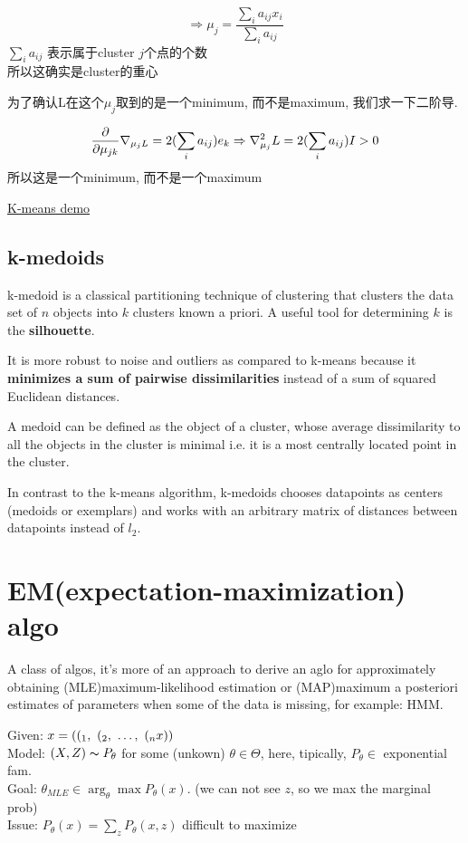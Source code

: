 \documentclass{article}
\begin{document}
$$
\Rightarrow
\mu_j = \dfrac{\sum_i a_{ij}x_i}{\sum_i a_{ij}}
$$
$\sum_i a_{ij}$  表示属于cluster $j$个点的个数\\
所以这确实是cluster的重心

为了确认L在这个$\mu_j$取到的是一个minimum, 而不是maximum, 我们求一下二阶导.

$$
\frac{\partial }{\partial \mu_{jk}} \nabla _{\mu_{j} L}
= 2(\sum_i a_{ij}) e_k
\Rightarrow
\nabla ^2_{\mu_j} L = 2(\sum_i a_{ij})I > 0
$$
所以这是一个minimum, 而不是一个maximum

\href{https://www.youtube.com/watch?v=zHbxbb2ye3E}{K-means demo}

\subsection{k-medoids}
k-medoid is a classical partitioning technique of clustering that clusters the data set of $n$ objects into $k$ clusters known a priori. 
A useful tool for determining $k$ is the \textbf{silhouette}.

It is more robust to noise and outliers as compared to k-means because it \textbf{minimizes a sum of pairwise dissimilarities} 
instead of a sum of squared Euclidean distances.

A medoid can be defined as the object of a cluster, whose average dissimilarity to all the objects in the cluster is minimal i.e. 
it is a most centrally located point in the cluster.

In contrast to the k-means algorithm, k-medoids chooses datapoints as centers (medoids or exemplars) and 
works with an arbitrary matrix of distances between datapoints instead of $l_2$.

\section{EM(expectation-maximization) algo}
A class of algos,
it's more of an approach to derive an aglo for approximately obtaining (MLE)maximum-likelihood estimation or 
(MAP)maximum a posteriori estimates of parameters when some of the data is missing, for example: HMM.

\noindent
Given: $x = ((_1,~(_2,~\ldots,~(_nx))$\\
Model: $(X, Z) \thicksim{P}_\theta$ for some (unkown) $\theta \in \Theta$, here, tipically, $P_\theta \in $ exponential fam.\\
Goal: $\theta_{MLE} \in \arg_\theta \max P_\theta(x)$. (we can not see $z$, so we max the marginal prob)\\
Issue: $P_\theta(x) = \sum_z P_\theta(x,z)$ difficult to maximize\\
\end{document}
